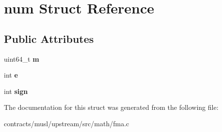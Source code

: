 \hypertarget{structnum}{}\section{num Struct Reference}
\label{structnum}
\subsection*{Public Attributes}
\begin{DoxyCompactItemize}
\item 
\mbox{\label{structnum_a38480037575b0a65985c28015bf2a6bf}} 
uint64\+\_\+t {\bfseries m}
\item 
\mbox{\label{structnum_a94967726128ceb83ad1d6dcd81ffed2c}} 
int {\bfseries e}
\item 
\mbox{\label{structnum_adec6b15e09e53015e482bb68621ce4ac}} 
int {\bfseries sign}
\end{DoxyCompactItemize}


The documentation for this struct was generated from the following file\+:\begin{DoxyCompactItemize}
\item 
contracts/musl/upstream/src/math/fma.\+c\end{DoxyCompactItemize}

